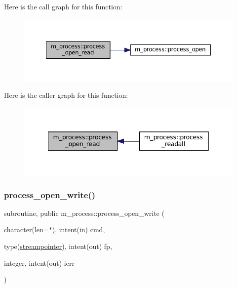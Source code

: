 Here is the call graph for this function\+:\nopagebreak
\begin{figure}[H]
\begin{center}
\leavevmode
\includegraphics[width=350pt]{namespacem__process_aaaf4d1926258a4cec7da7fc61c38c79d_cgraph}
\end{center}
\end{figure}
Here is the caller graph for this function\+:\nopagebreak
\begin{figure}[H]
\begin{center}
\leavevmode
\includegraphics[width=342pt]{namespacem__process_aaaf4d1926258a4cec7da7fc61c38c79d_icgraph}
\end{center}
\end{figure}
\mbox{\label{namespacem__process_aa6ed1404ab3472f5068ed15a7a01defc}} 
\subsubsection{\texorpdfstring{process\+\_\+open\+\_\+write()}{process\_open\_write()}}
{\footnotesize\ttfamily subroutine, public m\+\_\+process\+::process\+\_\+open\+\_\+write (\begin{DoxyParamCaption}\item[{character(len=$\ast$), intent(in)}]{cmd,  }\item[{type(\mbox{\hyperlink{structm__process_1_1streampointer}{streampointer}}), intent(out)}]{fp,  }\item[{integer, intent(out)}]{ierr }\end{DoxyParamCaption})}



